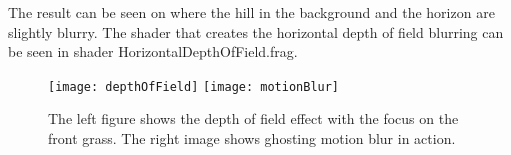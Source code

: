 
The result can be seen on  where the hill in
the background and the horizon are slightly blurry. The shader that
creates the horizontal depth of field blurring can be seen in shader
HorizontalDepthOfField.frag.

\begin{figure}
  \label{fig:dofMotionBlur}
  \centering
  \texttt{[image: depthOfField]}
  \texttt{[image: motionBlur]}
  \caption{The left figure shows the depth of field effect with the
    focus on the front grass. The right image shows ghosting motion
    blur in action.}
\end{figure}



